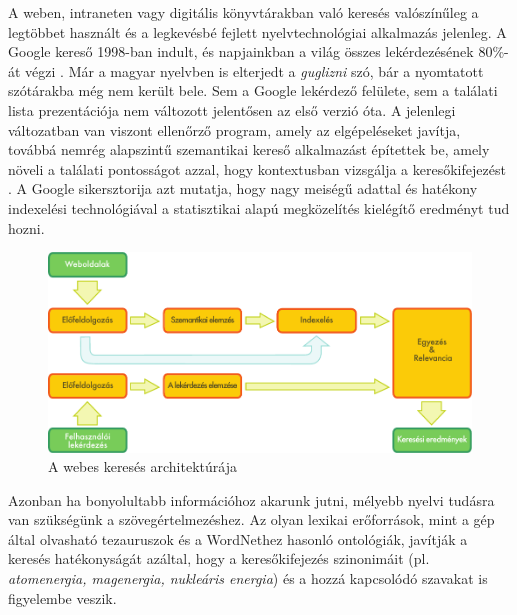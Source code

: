 \begin{multicols}{2}
  A weben, intraneten vagy digitális könyv\-tá\-rak\-ban való keresés valószínűleg a leg\-töb\-bet használt és a legkevésbé fejlett nyelv\-tech\-no\-ló\-giai alkalmazás jelenleg. A Google kereső 1998-ban indult, és napjainkban a világ összes lekérdezésének 80\%-át végzi \cite{spi1}. Már a magyar nyelvben is elterjedt a \textit{guglizni} szó, bár a nyomtatott szótárakba még nem került bele. Sem a Google lekérdező felülete, sem a találati lista prezentációja nem változott jelentősen az első verzió óta. A jelenlegi változatban van viszont ellenőrző program, amely az elgépeléseket javítja, továbbá nemrég alapszintű szemantikai kereső alkalmazást építettek be, amely növeli a találati pontosságot azzal, hogy kontextusban vizsgálja a keresőkifejezést \cite{pc1}. A Google sikersztorija azt mutatja, hogy nagy meiségű adattal és hatékony indexelési technológiával a statisztikai alapú megközelítés kielégítő eredményt tud hozni. 

  \begin{figure}[htb]
    \center
    \includegraphics[width=\textwidth]{../_media/hungarian/web_search_architecture}
    \caption{A webes keresés architektúrája}
    \label{fig:websearcharch_de}
  \end{figure}

  Azonban ha bonyolultabb információhoz akarunk jutni, mélyebb nyelvi tudásra van szükségünk a szövegértelmezéshez. Az olyan lexikai erőforrások, mint a gép által olvasható tezauruszok és a WordNethez hasonló ontológiák, javítják a keresés hatékonyságát azáltal, hogy a keresőkifejezés szinonimáit (pl. \textit{atomenergia, mag\-ener\-gia, nukleáris energia}) és a hozzá kapcsolódó szavakat is figyelembe veszik. 


\end{multicols}
